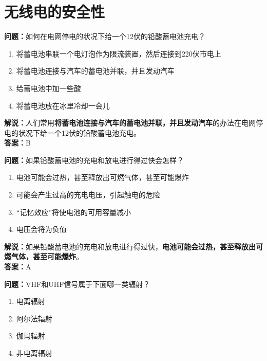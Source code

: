 \chapter{无线电的安全性}

\bigskip


\noindent\textbf{问题：}如何在电网停电的状况下给一个12伏的铅酸蓄电池充电？

\begin{enumerate}[label=\Alph*), leftmargin=3em]	
	\item 将蓄电池串联一个电灯泡作为限流装置，然后连接到220伏市电上
	\item 将蓄电池连接与汽车的蓄电池并联，并且发动汽车
	\item 给蓄电池中加一些酸
	\item 将蓄电池放在冰里冷却一会儿
\end{enumerate}

\noindent\textbf{解说：}人们常用\textbf{将蓄电池连接与汽车的蓄电池并联，并且发动汽车}的办法在电网停电的状况下给一个12伏的铅酸蓄电池充电。\\\noindent\textbf{答案：}B%

\bigskip


\noindent\textbf{问题：}如果铅酸蓄电池的充电和放电进行得过快会怎样？

\begin{enumerate}[label=\Alph*), leftmargin=3em]
	\item 电池可能会过热，甚至释放出可燃气体，甚至可能爆炸
	\item 可能会产生过高的充电电压，引起触电的危险
	\item “记忆效应”将使电池的可用容量减小
	\item 电压会将为负值
\end{enumerate}

\noindent\textbf{解说：}如果铅酸蓄电池的充电和放电进行得过快，\textbf{电池可能会过热，甚至释放出可燃气体，甚至可能爆炸}。\\\noindent\textbf{答案：}A%

\bigskip


\noindent\textbf{问题：}VHF和UHF信号属于下面哪一类辐射？

\begin{enumerate}[label=\Alph*), leftmargin=3em]
	\item 电离辐射
	\item 阿尔法辐射
	\item 伽玛辐射
	\item 非电离辐射
\end{enumerate}

